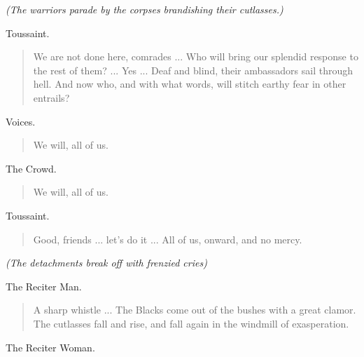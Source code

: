 \documentclass[letterpaper,article,12pt,oneside,notitlepage]{memoir}
\begin{document}
\textit{(The warriors parade by the corpses brandishing their cutlasses.)}

\begin{center}Toussaint.\end{center}

\begin{verse}
\indent We are not done here, comrades ... Who will bring our splendid response to the rest of them? ... Yes ... Deaf and blind, their ambassadors sail through hell. And now who, and with what words, will stitch earthy fear in other entrails? \\
\end{verse}

\begin{center}Voices.\end{center}

\begin{verse}
\hspace{1cm} We will, all of us. \\
\end{verse}

\begin{center}The Crowd.\end{center}

\begin{verse}
\hspace{1cm} We will, all of us. \\
\end{verse}

\begin{center}Toussaint.\end{center}

\begin{verse}
Good, friends ... let's do it ... All of us, onward, and no mercy. \\
\end{verse}

\textit{(The detachments break off with frenzied cries)}

\begin{center}The Reciter Man.\end{center}

\begin{verse}
\indent A sharp whistle ... The Blacks come out of the bushes with a great clamor. The cutlasses fall and rise, and fall again in the windmill of exasperation. \\
\end{verse}

\begin{center}The Reciter Woman.\end{center}
\end{document}
